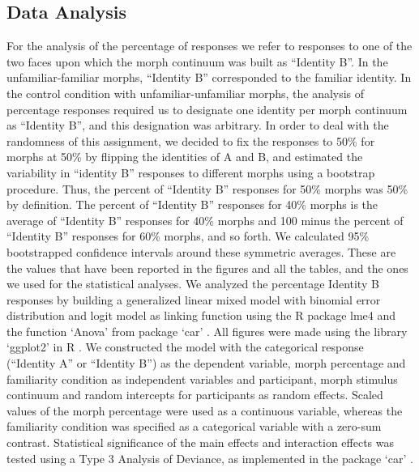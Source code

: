 \documentclass[10pt,letterpaper]{article}
\begin{document}
\subsection*{Data Analysis}
For the analysis of the percentage of responses we refer to responses to one of the two faces upon which the morph continuum was built as “Identity B”. In the unfamiliar-familiar morphs, “Identity B” corresponded to the familiar identity. In the control condition with unfamiliar-unfamiliar morphs, the analysis of percentage responses required us to designate one identity per morph continuum as “Identity B”, and this designation was arbitrary. In order to deal with the randomness of this assignment, we decided to fix the responses to 50\% for morphs at 50\% by flipping the identities of A and B, and estimated the variability in “identity B” responses to different morphs using a bootstrap procedure. Thus, the percent of “Identity B” responses for 50\% morphs was 50\% by definition.  The percent of “Identity B” responses for 40\% morphs is the average of “Identity B” responses for 40\% morphs and 100 minus the percent of “Identity B” responses for 60\% morphs, and so forth. We calculated 95\% bootstrapped confidence intervals around these symmetric averages. These are the values that have been reported in the figures and all the tables, and the ones we used for the statistical analyses.   
We analyzed the percentage Identity B responses by building a generalized linear mixed model with binomial error distribution and logit model as linking function using the R package lme4 \cite{bates2015walker} and the function ‘Anova’ from package ‘car’ \cite{fox2012package}. All figures were made using the library ‘ggplot2’ in R \cite{wickham2011ggplot2}. We constructed the model with the categorical response (“Identity A” or “Identity B”) as the dependent variable, morph percentage and familiarity condition as independent variables and participant, morph stimulus continuum and random intercepts for participants as random effects. Scaled values of the morph percentage were used as a continuous variable, whereas the familiarity condition was specified as a categorical variable with a zero-sum contrast. Statistical significance of the main effects and interaction effects was tested using a Type 3 Analysis of Deviance, as implemented in the package ‘car’ \cite{fox2012package}.  
\end{document}
